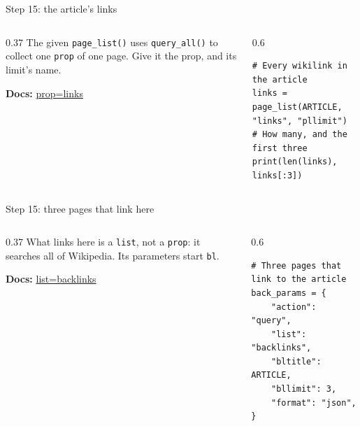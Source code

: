 \documentclass[9pt,aspectratio=169]{beamer}
\begin{document}
\begin{frame}[fragile]{Step 15: the article's links}
    \begin{columns}[T]
        \begin{column}{0.37\textwidth}
            The given \texttt{page\_list()} uses \texttt{query\_all()} to collect one \texttt{prop} of one page. Give it the prop, and its limit's name.

            \medskip
            {\scriptsize\textbf{Docs:} \href{https://www.mediawiki.org/wiki/API:Links}{prop=links}\par}
        \end{column}
        \begin{column}{0.6\textwidth}
\begin{lstlisting}
# Every wikilink in the article
links = page_list(ARTICLE, "links", "pllimit")
# How many, and the first three
print(len(links), links[:3])
\end{lstlisting}
        \end{column}
    \end{columns}
\end{frame}

\begin{frame}[fragile]{Step 15: three pages that link here}
    \begin{columns}[T]
        \begin{column}{0.37\textwidth}
            What links here is a \texttt{list}, not a \texttt{prop}: it searches all of Wikipedia. Its parameters start \texttt{bl}.

            \medskip
            {\scriptsize\textbf{Docs:} \href{https://www.mediawiki.org/wiki/API:Backlinks}{list=backlinks}\par}
        \end{column}
        \begin{column}{0.6\textwidth}
\begin{lstlisting}
# Three pages that link to the article
back_params = {
    "action": "query",
    "list": "backlinks",
    "bltitle": ARTICLE,
    "bllimit": 3,
    "format": "json",
}
\end{lstlisting}
        \end{column}
    \end{columns}
\end{frame}
\end{document}
